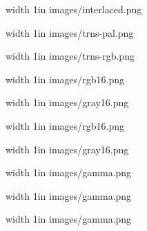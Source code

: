  
\def\inc#1{\pdfximage width 1in {images/#1}\pdfrefximage\pdflastximage\par}
\inc{interlaced.png}\inc{trns-pal.png}\inc{trns-rgb.png}
 \inc{rgb16.png}\inc{gray16.png}
 \inc{rgb16.png}\inc{gray16.png}
 \inc{gamma.png}
 \inc{gamma.png}
 \inc{gamma.png}
\bye
